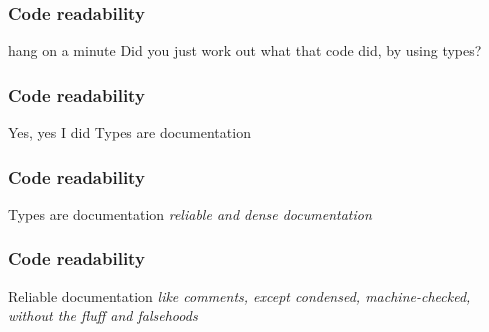 \begin{frame}[fragile]
\frametitle{Code readability}
\begin{block}{hang on a minute}
Did you just work out what that code did, by using types?
\end{block}
\end{frame}

\begin{frame}[fragile]
\frametitle{Code readability}
\begin{block}{Yes, yes I did}
Types are documentation
\end{block}
\end{frame}

\begin{frame}[fragile]
\frametitle{Code readability}
\begin{block}{Types are documentation}
\emph{reliable and dense documentation}
\end{block}
\end{frame}

\begin{frame}[fragile]
\frametitle{Code readability}
\begin{block}{Reliable documentation}
\emph{like comments, except condensed, machine-checked, without the fluff and falsehoods}
\end{block}
\end{frame}
